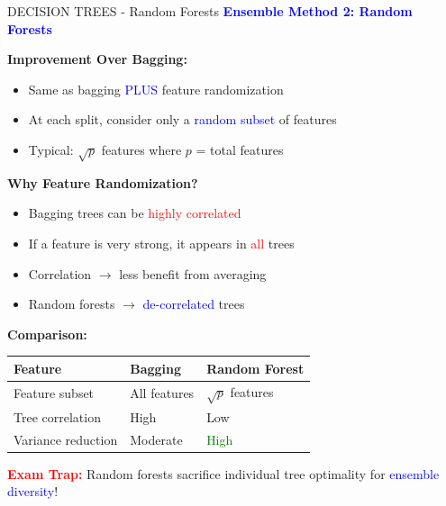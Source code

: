 \documentclass[8pt]{beamer}
\begin{document}
	\begin{frame}{DECISION TREES - Random Forests}
		\fontsize{6.5}{7.5}\selectfont
		\textcolor{blue}{\textbf{Ensemble Method 2: Random Forests}}
		
		\textbf{Improvement Over Bagging:}
		\begin{itemize}
			\item Same as bagging \textcolor{blue}{PLUS} feature randomization
			\item At each split, consider only a \textcolor{blue}{random subset} of features
			\item Typical: $\sqrt{p}$ features where $p$ = total features
		\end{itemize}
		
		\textbf{Why Feature Randomization?}
		\begin{itemize}
			\item Bagging trees can be \textcolor{red}{highly correlated}
			\item If a feature is very strong, it appears in \textcolor{red}{all} trees
			\item Correlation $\rightarrow$ less benefit from averaging
			\item Random forests $\rightarrow$ \textcolor{blue}{de-correlated} trees
		\end{itemize}
		
		\textbf{Comparison:}
		
		\begin{tabular}{|p{3cm}|p{3cm}|p{3cm}|}
			\hline
			\textbf{Feature} & \textbf{Bagging} & \textbf{Random Forest} \\
			\hline
			Feature subset & All features & $\sqrt{p}$ features \\
			\hline
			Tree correlation & High & Low \\
			\hline
			Variance reduction & Moderate & \textcolor{green}{High} \\
			\hline
		\end{tabular}
		
		\textcolor{red}{\textbf{Exam Trap:}} Random forests sacrifice individual tree optimality for \textcolor{blue}{ensemble diversity}!
	\end{frame}
	
\end{document}
